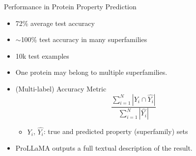\begin{frame}{Performance in Protein Property Prediction}
		\begin{itemize}
			\item 72\% average test accuracy
			\item $\sim$100\% test accuracy in many superfamilies
			\item 10k test examples
			\item One protein may belong to multiple superfamilies.
			\item (Multi-label) Accuracy Metric
			\begin{equation}
				\frac{\sum_{i=1}^N|Y_i \cap \hat{Y_i}|}{\sum_{i=1}^N|\hat{Y_i}|}
			\end{equation}
			\begin{itemize}
				\item $Y_i$, $\hat{Y_i}$: true and predicted property (superfamily) sets
			\end{itemize}
			\item ProLLaMA outputs a full textual description of the result.
		\end{itemize}
\end{frame}